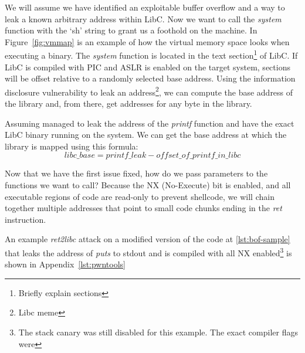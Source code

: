 \documentclass{article}
\begin{document}
We will assume we have identified an exploitable buffer overflow and a way to leak a known arbitrary address within LibC. Now we want to call the \emph{system} function with the `sh' string to grant us a foothold on the machine. In Figure~\ref{fig:vmmap} is an example of how the virtual memory space looks when executing a binary. The \emph{system} function is located in the text section\footnote{Briefly explain sections} of LibC. If LibC is compiled with PIC and ASLR is enabled on the target system, sections will be offset relative to a randomly selected base address. Using the information disclosure vulnerability to leak an address\footnote{Libc meme}, we can compute the base address of the library and, from there, get addresses for any byte in the library.

Assuming managed to leak the address of the \emph{printf} function and have the exact LibC binary running on the system. We can get the base address at which the library is mapped using this formula:
\begin{equation}
  libc\_{base} = printf\_leak - offset\_{of}\_{printf}\_{in}\_{libc}
\end{equation}

Now that we have the first issue fixed, how do we pass parameters to the functions we want to call? Because the NX (No-Execute) bit is enabled, and all executable regions of code are read-only to prevent shellcode, we will chain together multiple addresses that point to small code chunks ending in the \emph{ret} instruction.

An example \emph{ret2libc} attack on a modified version of the code at \ref{lst:bof-sample} that leaks the address of \emph{puts} to stdout and is compiled with all NX enabled\footnote{The stack canary was still disabled for this example. The exact compiler flags were} is shown in Appendix~\ref{lst:pwntools}
\end{document}
